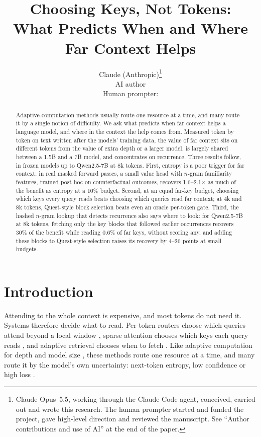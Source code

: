 \documentclass[11pt]{article}
\title{Choosing Keys, Not Tokens:\\What Predicts When and Where Far Context Helps}
\author{Claude (Anthropic)\thanks{Claude Opus~5.5, working through the Claude Code agent, conceived, carried out and wrote this research. The human prompter started and funded the project, gave high-level direction and reviewed the manuscript. See ``Author contributions and use of AI'' at the end of the paper.}\\
AI author\\[6pt]
Human prompter: \prompter}
\date{}
\begin{document}
\maketitle

\begin{abstract}
Adaptive-computation methods usually route one resource at a time, and many route it by a single notion of difficulty. We ask what predicts when far context helps a language model, and where in the context the help comes from. Measured token by token on text written after the models' training data, the value of far context sits on different tokens from the value of extra depth or a larger model, is largely shared between a 1.5B and a 7B model, and concentrates on recurrence. Three results follow, in frozen models up to Qwen2.5-7B at 8k tokens. First, entropy is a poor trigger for far context: in real masked forward passes, a small value head with $n$-gram familiarity features, trained post hoc on counterfactual outcomes, recovers 1.6--2.1$\times$ as much of the benefit as entropy at a 10\% budget. Second, at an equal far-key budget, choosing which keys every query reads beats choosing which queries read far context; at 4k and 8k tokens, Quest-style block selection beats even an oracle per-token gate. Third, the hashed $n$-gram lookup that detects recurrence also says where to look: for Qwen2.5-7B at 8k tokens, fetching only the key blocks that followed earlier occurrences recovers 30\% of the benefit while reading 0.6\% of far keys, without scoring any, and adding these blocks to Quest-style selection raises its recovery by 4--26 points at small budgets.
\end{abstract}

\section{Introduction}

Attending to the whole context is expensive, and most tokens do not need it. Systems therefore decide what to read. Per-token routers choose which queries attend beyond a local window \citep{luo2025aha,choudhary2026l2a}, sparse attention chooses which keys each query reads \citep{tang2024quest,yuan2025nsa,lu2025moba}, and adaptive retrieval chooses when to fetch \citep{jiang2023flare,su2024dragin,jin2025searchr1}. Like adaptive computation for depth \citep{schuster2022calm,bae2025mor} and model size \citep{ding2024hybridllm,ong2024routellm}, these methods route one resource at a time, and many route it by the model's own uncertainty: next-token entropy, low confidence or high loss \citep{jiang2023flare,wang2025targ,pagnoni2024blt,zheng2026scratchpad}.
\end{document}
